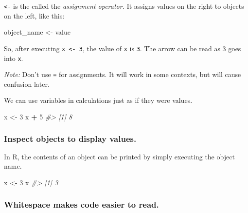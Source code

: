 \documentclass[]{book}
\newenvironment{Shaded}{\begin{snugshade}}{\end{snugshade}}
\newcommand{\CommentTok}[1]{\textcolor[rgb]{0.56,0.35,0.01}{\textit{#1}}}
\newcommand{\DecValTok}[1]{\textcolor[rgb]{0.00,0.00,0.81}{#1}}
\newcommand{\NormalTok}[1]{#1}
\newcommand{\OperatorTok}[1]{\textcolor[rgb]{0.81,0.36,0.00}{\textbf{#1}}}
\newcommand{\StringTok}[1]{\textcolor[rgb]{0.31,0.60,0.02}{#1}}
\begin{document}
\texttt{\textless{}-} is the called the \emph{assignment operator.} It assigns values on the right to objects on the left, like this:

\begin{Shaded}
\begin{Highlighting}[]
\NormalTok{object_name <-}\StringTok{ }\NormalTok{value}
\end{Highlighting}
\end{Shaded}

So, after executing \texttt{x\ \textless{}-\ 3}, the value of \texttt{x} is \texttt{3}. The arrow can be read as 3 goes into \texttt{x}.

\emph{Note:} Don't use \texttt{=} for assignments. It will work in some contexts, but will cause confusion later.

We can use variables in calculations just as if they were values.

\begin{Shaded}
\begin{Highlighting}[]
\NormalTok{x <-}\StringTok{ }\DecValTok{3}
\NormalTok{x }\OperatorTok{+}\StringTok{ }\DecValTok{5}
\CommentTok{#> [1] 8}
\end{Highlighting}
\end{Shaded}

\hypertarget{inspect-objects-to-display-values.}{%
\subsubsection*{Inspect objects to display values.}\label{inspect-objects-to-display-values.}}

In R, the contents of an object can be printed by simply executing the object name.

\begin{Shaded}
\begin{Highlighting}[]
\NormalTok{x <-}\StringTok{ }\DecValTok{3}
\NormalTok{x}
\CommentTok{#> [1] 3}
\end{Highlighting}
\end{Shaded}

\hypertarget{whitespace-makes-code-easier-to-read.}{%
\subsubsection*{Whitespace makes code easier to read.}\label{whitespace-makes-code-easier-to-read.}}
\end{document}
